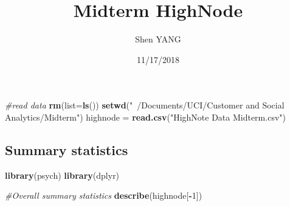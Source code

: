 \documentclass[]{article}
\title{Midterm HighNode}
\author{Shen YANG}
\date{11/17/2018}
\newenvironment{Shaded}{\begin{snugshade}}{\end{snugshade}}
\newcommand{\KeywordTok}[1]{\textcolor[rgb]{0.13,0.29,0.53}{\textbf{#1}}}
\newcommand{\DataTypeTok}[1]{\textcolor[rgb]{0.13,0.29,0.53}{#1}}
\newcommand{\DecValTok}[1]{\textcolor[rgb]{0.00,0.00,0.81}{#1}}
\newcommand{\StringTok}[1]{\textcolor[rgb]{0.31,0.60,0.02}{#1}}
\newcommand{\CommentTok}[1]{\textcolor[rgb]{0.56,0.35,0.01}{\textit{#1}}}
\newcommand{\OperatorTok}[1]{\textcolor[rgb]{0.81,0.36,0.00}{\textbf{#1}}}
\newcommand{\NormalTok}[1]{#1}
\begin{document}
\maketitle

\begin{Shaded}
\begin{Highlighting}[]
\CommentTok{#read data}
\KeywordTok{rm}\NormalTok{(}\DataTypeTok{list=}\KeywordTok{ls}\NormalTok{())}
\KeywordTok{setwd}\NormalTok{(}\StringTok{"~/Documents/UCI/Customer and Social Analytics/Midterm"}\NormalTok{)}
\NormalTok{highnode =}\StringTok{ }\KeywordTok{read.csv}\NormalTok{(}\StringTok{"HighNote Data Midterm.csv"}\NormalTok{)}
\end{Highlighting}
\end{Shaded}

\subsection{Summary statistics}\label{summary-statistics}

\begin{Shaded}
\begin{Highlighting}[]
\KeywordTok{library}\NormalTok{(psych)}
\KeywordTok{library}\NormalTok{(dplyr)}

\CommentTok{#Overall summary statistics}
\KeywordTok{describe}\NormalTok{(highnode[}\OperatorTok{-}\DecValTok{1}\NormalTok{])}
\end{Highlighting}
\end{Shaded}
\end{document}
